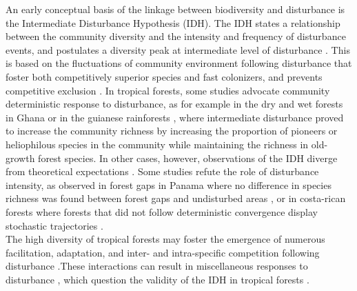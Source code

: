 \documentclass[fleqn,10pt]{ArtEcoFoG} %
\begin{document}
An early conceptual basis of the linkage between biodiversity and
disturbance is the Intermediate Disturbance Hypothesis (IDH). The IDH
states a relationship between the community diversity and the intensity
and frequency of disturbance events, and postulates a diversity peak at
intermediate level of disturbance \citep{Connell1978}. This is based on
the fluctuations of community environment following disturbance that
foster both competitively superior species and fast colonizers, and
prevents competitive exclusion \citep{Shea2004, Pulsford2016}.
\color{red} In tropical forests, some studies advocate community
deterministic response to disturbance, as for example in the dry and wet
forests in Ghana \citep{Bongers2009} or in the guianese rainforests
\citep{Molino2001}, where intermediate disturbance proved to increase
the community richness by increasing the proportion of pioneers or
heliophilous species in the community while maintaining the richness in
old-growth forest species. In other cases, however, observations of the
IDH diverge from theoretical expectations
\citep{Hugues2007, Sheil2003, Norden2017}. Some studies refute the role
of disturbance intensity, as observed in forest gaps in Panama where no
difference in species richness was found between forest gaps and
undisturbed areas \citep{Hubbell2001}, or in costa-rican forests where
forests that did not follow deterministic convergence display stochastic
trajectories \citep{Norden2015}.\\
The high diversity of tropical forests may foster the emergence of
numerous facilitation, adaptation, and inter- and intra-specific
competition following disturbance
\citep{Garcia_florez2017, Bongers2009}.These interactions can result in
miscellaneous responses to disturbance \citep{Lindenmayer2012}, which
question the validity of the IDH in tropical forests
\citep{Hubbell2001, Fox2013, Sheil2013}. \color{black}
\end{document}
